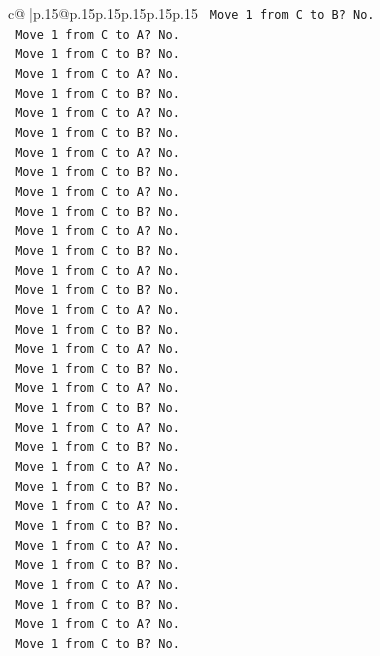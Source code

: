 \documentclass{article}
\begin{document}
{\begin{supertabular}{c@{$\;$}|p{.15\linewidth}@{}p{.15\linewidth}p{.15\linewidth}p{.15\linewidth}p{.15\linewidth}p{.15\linewidth}}
{{{\texttt{   Move 1 from C to B? No.} \\
\texttt{   Move 1 from C to A? No.} \\
\texttt{   Move 1 from C to B? No.} \\
\texttt{   Move 1 from C to A? No.} \\
\texttt{   Move 1 from C to B? No.} \\
\texttt{   Move 1 from C to A? No.} \\
\texttt{   Move 1 from C to B? No.} \\
\texttt{   Move 1 from C to A? No.} \\
\texttt{   Move 1 from C to B? No.} \\
\texttt{   Move 1 from C to A? No.} \\
\texttt{   Move 1 from C to B? No.} \\
\texttt{   Move 1 from C to A? No.} \\
\texttt{   Move 1 from C to B? No.} \\
\texttt{   Move 1 from C to A? No.} \\
\texttt{   Move 1 from C to B? No.} \\
\texttt{   Move 1 from C to A? No.} \\
\texttt{   Move 1 from C to B? No.} \\
\texttt{   Move 1 from C to A? No.} \\
\texttt{   Move 1 from C to B? No.} \\
\texttt{   Move 1 from C to A? No.} \\
\texttt{   Move 1 from C to B? No.} \\
\texttt{   Move 1 from C to A? No.} \\
\texttt{   Move 1 from C to B? No.} \\
\texttt{   Move 1 from C to A? No.} \\
\texttt{   Move 1 from C to B? No.} \\
\texttt{   Move 1 from C to A? No.} \\
\texttt{   Move 1 from C to B? No.} \\
\texttt{   Move 1 from C to A? No.} \\
\texttt{   Move 1 from C to B? No.} \\
\texttt{   Move 1 from C to A? No.} \\
\texttt{   Move 1 from C to B? No.} \\
\texttt{   Move 1 from C to A? No.} \\
\texttt{   Move 1 from C to B? No.} \\
}}}
\end{supertabular}}
\end{document}

